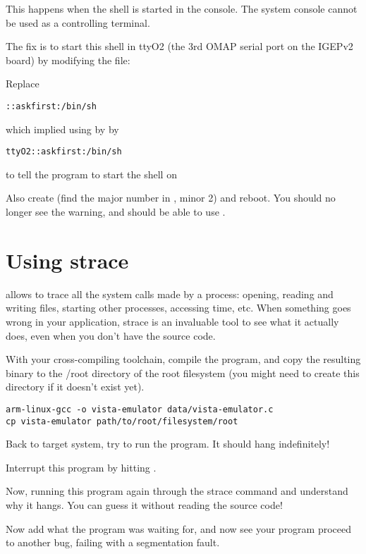 This happens when the shell is started in the console. The system
console cannot be used as a controlling terminal.

The fix is to start this shell in ttyO2 (the 3rd OMAP serial port on
the IGEPv2 board) by modifying the  file:

Replace
\begin{verbatim}
::askfirst:/bin/sh
\end{verbatim}
which implied using  by
by
\begin{verbatim}
ttyO2::askfirst:/bin/sh
\end{verbatim}
to tell the  program to start the shell on 

Also create  (find the major number in
, minor 2) and reboot. You should no longer see
the  warning, and should be able to use
\code{[Ctrl] [C]}.

\section{Using strace}

 allows to trace all the system calls made by a process:
opening, reading and writing files, starting other processes,
accessing time, etc. When something goes wrong in your application,
strace is an invaluable tool to see what it actually does, even when
you don't have the source code.

With your cross-compiling toolchain, compile the
 program, and copy the resulting binary to
the /root directory of the root filesystem (you might need to create
this directory if it doesn't exist yet).

\begin{verbatim}
arm-linux-gcc -o vista-emulator data/vista-emulator.c
cp vista-emulator path/to/root/filesystem/root
\end{verbatim}

Back to target system, try to run the 
program. It should hang indefinitely!

Interrupt this program by hitting \code{[Ctrl] [C]}.

Now, running this program again through the strace command and
understand why it hangs. You can guess it without reading the source
code!

Now add what the program was waiting for, and now see your program
proceed to another bug, failing with a segmentation fault.

